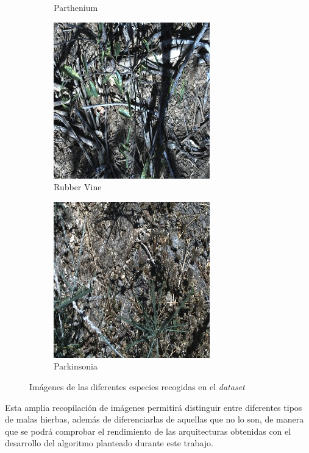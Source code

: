 \begin{figure}[h]
\begin{subfigure}{0.24\textwidth}
        \caption{Parthenium}
    \end{subfigure}
    \hfill
    \begin{subfigure}{0.24\textwidth}
        \includegraphics[width=\textwidth]{figuras/problema/rubber_vine.jpg}
        \caption{Rubber Vine}
    \end{subfigure}
    \hfill
    \begin{subfigure}{0.24\textwidth}
        \includegraphics[width=\textwidth]{figuras/problema/parkinsonia.jpg}
        \caption{Parkinsonia}
    \end{subfigure}
    \caption{Imágenes de las diferentes especies recogidas en el \textit{dataset}}
    \label{fig:dataset_ejemplo_grande}
\end{figure}

Esta amplia recopilación de imágenes permitirá distinguir entre diferentes tipos de malas hierbas, además de diferenciarlas de aquellas que no lo son, de manera que se podrá comprobar el rendimiento de las arquitecturas obtenidas con el desarrollo del algoritmo planteado durante este trabajo.